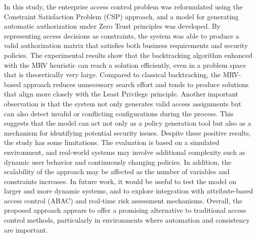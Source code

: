 \documentclass[conference]{IEEEtran}
\begin{document}
	In this study, the enterprise access control problem was reformulated using the Constraint Satisfaction Problem (CSP) approach, and a model for generating automatic authorization under Zero Trust principles was developed. By representing access decisions as constraints, the system was able to produce a valid authorization matrix that satisfies both business requirements and security policies.
The experimental results show that the backtracking algorithm enhanced with the MRV heuristic can reach a solution efficiently, even in a problem space that is theoretically very large. Compared to classical backtracking, the MRV-based approach reduces unnecessary search effort and tends to produce solutions that align more closely with the Least Privilege principle.
Another important observation is that the system not only generates valid access assignments but can also detect invalid or conflicting configurations during the process. This suggests that the model can act not only as a policy generation tool but also as a mechanism for identifying potential security issues.
Despite these positive results, the study has some limitations. The evaluation is based on a simulated environment, and real-world systems may involve additional complexity such as dynamic user behavior and continuously changing policies. In addition, the scalability of the approach may be affected as the number of variables and constraints increases.
In future work, it would be useful to test the model on larger and more dynamic systems, and to explore integration with attribute-based access control (ABAC) and real-time risk assessment mechanisms. Overall, the proposed approach appears to offer a promising alternative to traditional access control methods, particularly in environments where automation and consistency are important.
\end{document}
